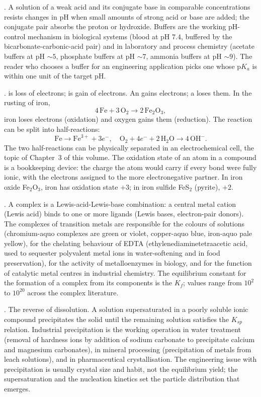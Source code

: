 . A solution of a weak acid and its conjugate base in
comparable concentrations resists changes in pH when small amounts of
strong acid or base are added; the conjugate pair absorbs the proton
or hydroxide. Buffers are the working pH-control mechanism in
biological systems (blood at pH $7.4$, buffered by the
bicarbonate-carbonic-acid pair) and in laboratory and process
chemistry (acetate buffers at pH $\sim 5$, phosphate buffers at
pH $\sim 7$, ammonia buffers at pH $\sim 9$). The reader who chooses
a buffer for an engineering application picks one whose p$K_a$ is
within one unit of the target pH.

.  is loss of electrons;
 is gain of electrons. An 
gains electrons; a  loses them. In the rusting
of iron,
\[
4\,\text{Fe} + 3\,\text{O}_2 \to 2\,\text{Fe}_2\text{O}_3,
\]
iron loses electrons (oxidation) and oxygen gains them (reduction).
The reaction can be split into half-reactions:
\[
\text{Fe} \to \text{Fe}^{3+} + 3 e^-, \quad \text{O}_2 + 4 e^- + 2\,
\text{H}_2\text{O} \to 4\,\text{OH}^-.
\]
The two half-reactions can be physically separated in an
electrochemical cell, the topic of Chapter~3 of this volume. The
oxidation state of an atom in a compound is a bookkeeping device: the
charge the atom would carry if every bond were fully ionic, with the
electrons assigned to the more electronegative partner. In iron
oxide Fe$_2$O$_3$, iron has oxidation state $+3$; in iron sulfide
FeS$_2$ (pyrite), $+2$.

. A complex is a Lewis-acid-Lewis-base
combination: a central metal cation (Lewis acid) binds to one or more
ligands (Lewis bases, electron-pair donors). The complexes of
transition metals are responsible for the colours of solutions
(chromium-aquo complexes are green or violet, copper-aquo blue,
iron-aquo pale yellow), for the chelating behaviour of EDTA
(ethylenediaminetetraacetic acid, used to sequester polyvalent metal
ions in water-softening and in food preservation), for the activity
of metalloenzymes in biology, and for the function of catalytic
metal centres in industrial chemistry. The equilibrium constant for
the formation of a complex from its components is the
 $K_f$; values range from $10^2$ to
$10^{20}$ across the complex literature.

. The reverse of dissolution. A solution
supersaturated in a poorly soluble ionic compound precipitates the
solid until the remaining solution satisfies the $K_{sp}$ relation.
Industrial precipitation is the working operation in water treatment
(removal of hardness ions by addition of sodium carbonate to
precipitate calcium and magnesium carbonates), in mineral processing
(precipitation of metals from leach solutions), and in pharmaceutical
crystallisation. The engineering issue with precipitation is usually
crystal size and habit, not the equilibrium yield; the supersaturation
and the nucleation kinetics set the particle distribution that
emerges.

